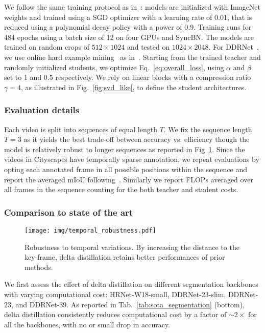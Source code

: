\documentclass[runningheads]{llncs}
\begin{document}
We follow the same training protocol as in~\cite{ddrnet,hrnet}: models are initialized with ImageNet weights and trained using a SGD optimizer with a learning rate of 0.01, that is reduced using a polynomial decay policy with a power of 0.9. 
Training runs for 484 epochs using a batch size of 12 on four GPUs and SyncBN.
The models are trained on random crops of $512\times1024$ and tested on $1024\times2048$. For DDRNet~\cite{ddrnet}, we use online hard example mining~\cite{shrivastava2016training} as in~\cite{ddrnet}.
Starting from the trained teacher and randomly initialized students, we optimize Eq.~\ref{eq:overall_loss}, using $\alpha$ and $\beta$ set to 1 and 0.5 respectively.
We rely on linear blocks with a compression ratio $\gamma=4$, as illustrated in Fig.~\ref{fig:svd_like}, to define the student architectures.
\subsubsection{Evaluation details}
Each video is split into sequences of equal length $T$. We fix the sequence length $T=3$ as it yields the best trade-off between accuracy vs. efficiency though the model is relatively robust to longer sequences as reported in Fig~\ref{fig:temporal_robustness}.
Since the videos in Cityscapes have temporally sparse annotation, we repeat evaluations by opting each annotated frame in all possible positions within the sequence and report the averaged mIoU following~\cite{hu2020tdnet}. Similarly we report FLOPs averaged over all frames in the sequence counting for the both teacher and student costs.
\subsubsection{Comparison to state of the art}
\label{sec:segmentation_sota}
\begin{figure}[t]
\centering
\texttt{[image: img/temporal\_robustness.pdf]}
\caption{Robustness to temporal variations. By increasing the distance to the key-frame, delta distillation retains better performances of prior methods.}
\label{fig:temporal_robustness}
\vspace{-6mm}
\end{figure} We first assess the effect of delta distillation on different segmentation backbones with varying computational cost: HRNet-W18-small, DDRNet-23-slim, DDRNet-23, and DDRNet-39. 
As reported in Tab.~\ref{tab:sota_segmentation} (bottom), delta distillation consistently reduces computational cost by a factor of $\sim2\times$ for all the backbones, with no or small drop in accuracy.
\end{document}
